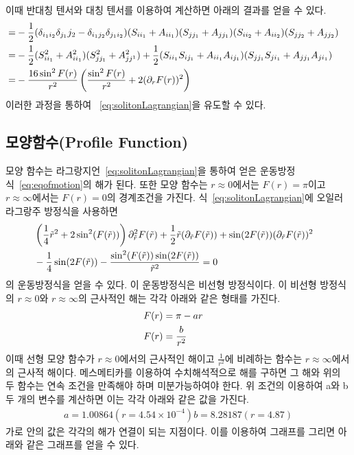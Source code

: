 \documentclass[superscriptaddress,
nofootinbib,byrevtex,fleqn,prd,12pt]{revtex4}
\begin{document}
이때 반대칭 텐서와 대칭 텐서를 이용하여 계산하면 아래의 결과를 얻을 수 있다.
\begin{align}
=&-\frac{1}{2}(\delta_{i_1i_2}\delta_{j_1}{j_2}-\delta_{i_1j_2}\delta_{j_1i_2})(S_{ii_1}+A_{ii_1})(S_{jj_1}+A_{jj_1})(S_{ii_2}+A_{ii_2})(S_{jj_2}+A_{jj_2})\cr
=&-\frac{1}{2}(S_{ii_1}^2+A_{ii_1}^2)(S_{jj_1}^2+A_{jj^1}^2)+\frac{1}{2}(S_{ii_1}S_{ij_1}+A_{ii_1}A_{ij_1})(S_{jj_1}S_{ji_1}+A_{jj_1}A_{ji_1})\cr
=&-\frac{16\sin^2F(r)}{r^2}\left(\frac{\sin^2F(r)}{r^2}+2(\partial_{r}F(r))^{2}\right)
\end{align}
이러한 과정을 통하여 ~\eqref{eq:solitonLagrangian}을 유도할 수 있다.
\subsection{모양함수(Profile Function)}\label{52}
모양 함수는 라그랑지언~\eqref{eq:solitonLagrangian}을 통하여 얻은 운동방정식~\eqref{eq:eqofmotion}의 해가 된다. 또한 모양 함수는 $ r \approx 0$에서는 $F(r)= \pi$이고 $r \approx \infty$에서는 $F(r) = 0$의 경계조건을 가진다.
식~\eqref{eq:solitonLagrangian}에 오일러 라그랑주 방정식을 사용하면
\begin{align}
  & \left(\frac{1}{4} \tilde{r}^{2} +2 \sin^{2} (F(\tilde{r})) \right)\partial_{\tilde{r}}^{2}F(\tilde{r})+ \frac{1}{2}\tilde{r}(\partial_{\tilde{r}}F(\tilde{r})) +\sin(2F(\tilde{r}))(\partial_{\tilde{r}}F(\tilde{r}))^{2} \cr
  & - \frac{1}{4} \sin(2F(\tilde{r})) - \frac{\sin^{2}(F(\tilde{r}))\sin(2F(\tilde{r}))}{\tilde{r}^{2}} = 0 \label{eq:eqofmotion}
\end{align}
의 운동방정식을 얻을 수 있다. 이 운동방정식은 비선형 방정식이다. 이 비선형 방정식의 $r \approx 0$와 $r \approx \infty$의 근사적인 해는 각각 아래와 같은 형태를 가진다.
 \begin{align}
F(r)&= \pi - a r \cr
F(r)&= \frac{b}{r^{2}}
 \end{align}
 이때 선형 모양 함수가 $r \approx 0$에서의 근사적인 해이고 $\frac{1}{r^{2}} $에 비례하는 함수는 $r \approx \infty$에서의 근사적 해이다.
 메스메티카를 이용하여 수치해석적으로 해를 구하면 그 해와 위의 두 함수는 연속 조건을 만족해야 하며 미분가능하여야 한다. 위 조건의 이용하여 a와 b 두 개의 변수를 계산하면 이는 각각 아래와 같은 값을 가진다.\cite{2,4}
\begin{align}
  a = 1.00864 (r=4.54 \times 10^{-4})
  b = 8.28187 (r=4.87)
\end{align}
가로 안의 값은 각각의 해가 연결이 되는 지점이다. 이를 이용하여 그래프를 그리면 아래와 같은 그래프를 얻을 수 있다.
\newpage
\end{document}
